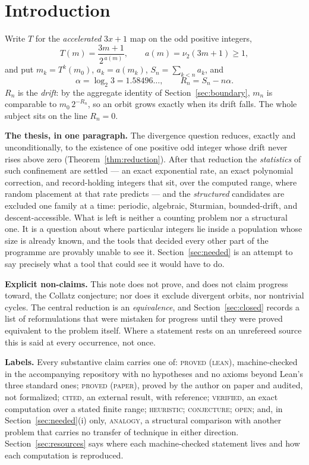 \documentclass[11pt,reqno]{amsart}
\theoremstyle{plain}
\theoremstyle{definition}
\newcommand{\vt}{\nu_2}
\newcommand{\lab}[1]{\textnormal{\textsc{\small #1}}}
\begin{document}
\section{Introduction}\label{sec:intro}

Write $T$ for the \emph{accelerated} $3x+1$ map on the odd positive integers,
\[
T(m)=\frac{3m+1}{2^{\,a(m)}},\qquad a(m)=\vt(3m+1)\ge 1,
\]
and put $m_k=T^k(m_0)$, $a_k=a(m_k)$, $S_n=\sum_{k<n}a_k$, and
\[
\alpha=\log_2 3=1.58496\ldots,\qquad R_n=S_n-n\alpha .
\]
$R_n$ is the \emph{drift}: by the aggregate identity of Section~\ref{sec:boundary},
$m_n$ is comparable to $m_0\,2^{-R_n}$, so an orbit grows exactly when its drift
falls. The whole subject sits on the line $R_n=0$.

\medskip
\noindent\textbf{The thesis, in one paragraph.} The divergence question reduces,
exactly and unconditionally, to the existence of one positive odd integer whose
drift never rises above zero (Theorem~\ref{thm:reduction}). After that reduction
the \emph{statistics} of such confinement are settled --- an exact exponential
rate, an exact polynomial correction, and record-holding integers that sit, over
the computed range, where random placement at that rate predicts --- and the
\emph{structured} candidates are excluded one family at a time: periodic,
algebraic, Sturmian, bounded-drift, and descent-accessible. What is left is
neither a counting problem nor a structural one. It is a question about where
particular integers lie inside a population whose size is already known, and
the tools that decided every other part of the programme are provably unable
to see it. Section~\ref{sec:needed} is an attempt to say precisely what a tool
that could see it would have to do.

\medskip
\noindent\textbf{Explicit non-claims.} This note does not prove, and does not
claim progress toward, the Collatz conjecture; nor does it exclude divergent
orbits, nor nontrivial cycles. The central reduction is an \emph{equivalence},
and Section~\ref{sec:closed} records a list of reformulations that were mistaken
for progress until they were proved equivalent to the problem itself. Where a
statement rests on an unrefereed source this is said at every occurrence, not
once.

\medskip
\noindent\textbf{Labels.} Every substantive claim carries one of:
\lab{proved (lean)}, machine-checked in the accompanying repository with no
hypotheses and no axioms beyond Lean's three standard ones;
\lab{proved (paper)}, proved by the author on paper and audited, not formalized;
\lab{cited}, an external result, with reference;
\lab{verified}, an exact computation over a stated finite range;
\lab{heuristic}; \lab{conjecture}; \lab{open}; and, in
Section~\ref{sec:needed}(i) only, \lab{analogy}, a structural comparison with
another problem that carries no transfer of technique in either direction.
Section~\ref{sec:resources} says
where each machine-checked statement lives and how each computation is
reproduced.
\end{document}
